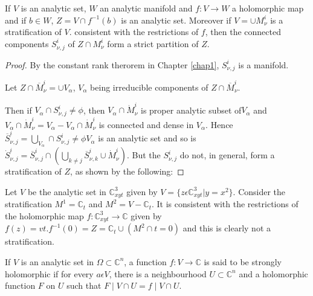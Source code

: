 \setcounter{remark}{5}
\begin{remark}\label{chap2-rem6} %
  If $V$ is an analytic set, $W$ an analytic manifold and $f:V
  \rightarrow W$ a holomorphic map and if $b \in W$, $Z = V \cap f^{-1}
  (b)$ is an analytic set. Moreover if $V = \cup M^i_\nu$ is a
  stratification of $V$. consistent with the restrictions of $f$, then
  the connected components $S^i_{\nu,j}$ of $Z \cap M^i_\nu$ form a
  strict partition of $Z$. 
\end{remark}

\begin{proof}
By the constant rank therorem in Chapter \ref{chap1}, $S^i_{\nu,j}$ is
a manifold. 

Let $Z \cap \overline{M}^i_\nu = \cup V_{\alpha}$, $V_\alpha$ being
irreducible components of $Z \cap \overline{M}_\nu^i$.  

Then if $V_{\alpha} \cap S^i_{\nu,j} \neq \phi$, then $V_{\alpha} \cap
\dot{M}^i_\nu$ is proper analytic subset of\pageoriginale $V_{\alpha}$
and $V_{\alpha}\cap \dot{M}^i_\nu = V_{\alpha} - V_{\alpha} \cap \dot{M}^i_\nu$ is
connected and dense in $V_{\alpha}$. Hence $\overline{S}^i_{\nu,j}=
\bigcup\limits_{V_{\alpha}} \cap S^i_{\nu,j}\neq \phi V_{\alpha}$ is an
analytic set and so is $\dot{S}^i_{\nu,j}=\overline{S}^i_{\nu,j}\cap
(\bigcup \limits_{k \neq j} \overline{S}^i_{\nu,k} \cup
\dot{M}^i_\nu)$. But the $S^i_{\nu,j}$ do not, in general, form a
stratification of $Z$, as shown by the following: 
\end{proof}

\setcounter{example}{2}
\begin{example}\label{chap2-exam3} %
  Let $V$ be the analytic set in $ \mathbb{C}^3_{xyt}$ given by $V =
  \bigg\{z \epsilon  \mathbb{C}^3_{xyt}\big| y = x^2
  \bigg\}$. Consider the stratification $M^1 =  \mathbb{C}_t$ and $M^2
  = V -  \mathbb{C}_t$. It is consistent with the restrictions of the
  holomorphic map $f:  \mathbb{C}^3_{xyt}\rightarrow  \mathbb{C}$
  given by $f(z) = vt. f^{-1}(0) = Z =  \mathbb{C}_t \cup (M^2 \cap
  t=0)$ and this is clearly not a stratification. 
\end{example}

\begin{definition}\label{chap2-defin2} %
  If $V$ is an analytic set in $\Omega \subset  \mathbb{C}^n$, a
  function $f:V \rightarrow  \mathbb{C}$ is said to be strongly
  holomorphic if for every $a \epsilon V$, there is a neighbourhood $U
  \subset  \mathbb{C}^n$ and a holomorphic function $F$ on $U$ such
  that $F \mid V \cap U = f \mid V \cap U$.  
\end{definition} 

